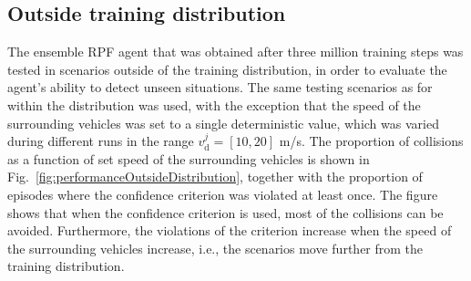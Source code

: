 \subsection{Outside training distribution}

The ensemble RPF agent that was obtained after three million training steps was tested in scenarios outside of the training distribution, in order to evaluate the agent's ability to detect unseen situations. The same testing scenarios as for within the distribution was used, with the exception that the speed of the surrounding vehicles was set to a single deterministic value, which was varied during different runs in the range $v_\mathrm{d}^j=[10,20]$ m/s. The proportion of collisions as a function of set speed of the surrounding vehicles is shown in Fig.~\ref{fig:performanceOutsideDistribution}, together with the proportion of episodes where the confidence criterion was violated at least once. The figure shows that when the confidence criterion is used, most of the collisions can be avoided. Furthermore, the violations of the criterion increase when the speed of the surrounding vehicles increase, i.e., the scenarios move further from the training distribution.

